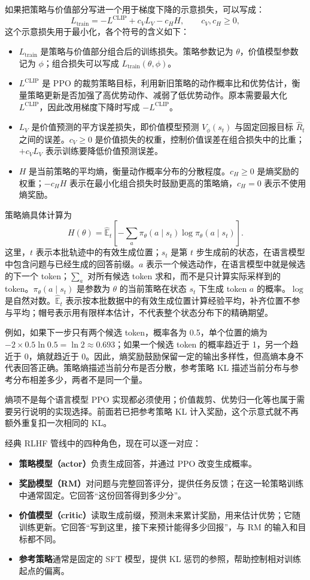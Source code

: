 如果把策略与价值部分写进一个用于梯度下降的示意损失，可以写成：
\[
    L_{\mathrm{train}}=-L^{\mathrm{CLIP}}+c_V L_V-c_H H,
    \qquad c_V,c_H\geq0,
\]
这个示意损失用于最小化，各个符号的含义如下：
\begin{itemize}
    \item $L_{\mathrm{train}}$ 是策略与价值部分组合后的训练损失。策略参数记为 $\theta$，价值模型参数记为 $\phi$；组合损失可以写成 $L_{\mathrm{train}}(\theta,\phi)$。
    \item $L^{\mathrm{CLIP}}$ 是 PPO 的裁剪策略目标，利用新旧策略的动作概率比和优势估计，衡量策略更新是否加强了高优势动作、减弱了低优势动作。原本需要最大化 $L^{\mathrm{CLIP}}$，因此改用梯度下降时写成 $-L^{\mathrm{CLIP}}$。
    \item $L_V$ 是价值预测的平方误差损失，即价值模型预测 $V_\phi(s_t)$ 与固定回报目标 $\widehat R_t$ 之间的误差。$c_V\geq0$ 是价值损失的权重，控制价值误差在组合损失中的比重；$+c_VL_V$ 表示训练要降低价值预测误差。
    \item $H$ 是当前策略的平均熵，衡量动作概率分布的分散程度。$c_H\geq0$ 是熵奖励的权重；$-c_HH$ 表示在最小化组合损失时鼓励更高的策略熵，$c_H=0$ 表示不使用熵奖励。
\end{itemize}
策略熵具体计算为
\[
H(\theta)=\widehat{\mathbb E}_t\left[
-\sum_a\pi_\theta(a\mid s_t)\log\pi_\theta(a\mid s_t)
\right].
\]
这里，$t$ 表示本批轨迹中的有效生成位置；$s_t$ 是第 $t$ 步生成前的状态，在语言模型中包含问题与已经生成的回答前缀。$a$ 表示一个候选动作，在语言模型中就是候选的下一个 token；$\sum_a$ 对所有候选 token 求和，而不是只计算实际采样到的 token。$\pi_\theta(a\mid s_t)$ 是参数为 $\theta$ 的当前策略在状态 $s_t$ 下生成 token $a$ 的概率。$\log$ 是自然对数。$\widehat{\mathbb E}_t$ 表示按本批数据中的有效生成位置计算经验平均，补齐位置不参与平均；帽号表示用有限样本估计，不代表整个状态分布下的精确期望。

例如，如果下一步只有两个候选 token，概率各为 0.5，单个位置的熵为 $-2\times0.5\ln0.5=\ln2\approx0.693$；如果一个候选 token 的概率趋近于 1，另一个趋近于 0，熵就趋近于 0。因此，熵奖励鼓励保留一定的输出多样性，但高熵本身不代表回答正确。策略熵描述当前分布是否分散，参考策略 KL 描述当前分布与参考分布相差多少，两者不是同一个量。

熵项不是每个语言模型 PPO 实现都必须使用；价值裁剪、优势归一化等也属于需要另行说明的实现选择。前面若已把参考策略 KL 计入奖励，这个示意式就不再额外重复扣一次相同的 KL。

经典 RLHF 管线中的四种角色，现在可以逐一对应：
\begin{itemize}
    \item \textbf{策略模型（actor）}负责生成回答，并通过 PPO 改变生成概率。
    \item \textbf{奖励模型（RM）}对问题与完整回答评分，提供任务反馈；在这一轮策略训练中通常固定。它回答``这份回答得到多少分''。
    \item \textbf{价值模型（critic）}读取生成前缀，预测未来累计奖励，用来估计优势；它随训练更新。它回答``写到这里，接下来预计能得多少回报''，与 RM 的输入和目标都不同。
    \item \textbf{参考策略}通常是固定的 SFT 模型，提供 KL 惩罚的参照，帮助控制相对训练起点的偏离。
\end{itemize}

